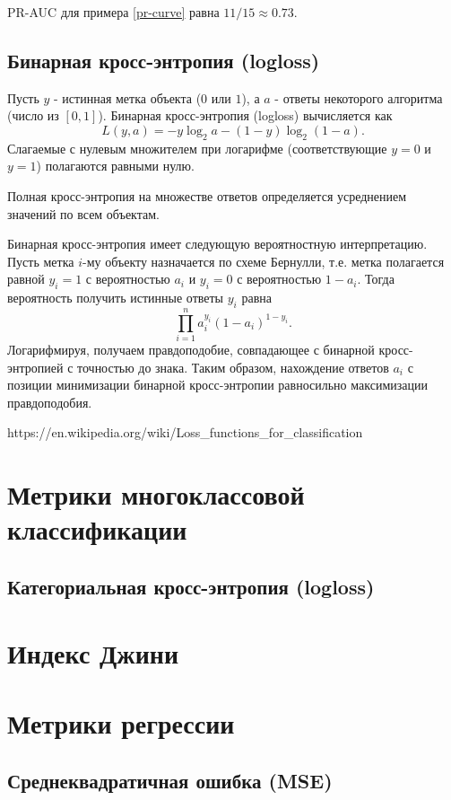 PR-AUC для примера \ref{pr-curve} равна $11/15\approx 0.73$.

\subsection{Бинарная кросс-энтропия (logloss)}

Пусть $y$ - истинная метка объекта ($0$ или $1$), а $a$ - ответы некоторого алгоритма (число из $[0, 1]$). Бинарная кросс-энтропия (logloss) вычисляется как
$$
L(y, a) = -y\log_2 a - (1-y)\log_2(1-a).
$$
Слагаемые с нулевым множителем при логарифме (соответствующие $y=0$ и $y=1$) полагаются равными нулю.

Полная кросс-энтропия на множестве ответов определяется усреднением значений по всем объектам.

Бинарная кросс-энтропия имеет следующую вероятностную интерпретацию. Пусть метка $i$-му объекту назначается по схеме Бернулли, т.е. метка полагается равной $y_i=1$ с вероятностью $a_i$ и $y_i=0$ с вероятностью $1-a_i$. Тогда вероятность получить истинные ответы $y_i$ равна
$$
\prod_{i=1}^na_i^{y_i}(1-a_i)^{1-y_i}.
$$
Логарифмируя, получаем правдоподобие, совпадающее с бинарной кросс-энтропией с точностью до знака. Таким образом, нахождение ответов $a_i$ с позиции минимизации бинарной кросс-энтропии равносильно максимизации правдоподобия.


https://en.wikipedia.org/wiki/Loss_functions_for_classification


\section{Метрики многоклассовой классификации}

\subsection{Категориальная кросс-энтропия (logloss)}


\section{Индекс Джини}


\section{Метрики регрессии}

\subsection{Среднеквадратичная ошибка (MSE)}

